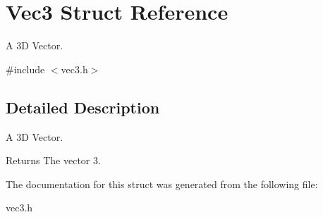 \hypertarget{struct_vec3}{}\section{Vec3 Struct Reference}
\label{struct_vec3}


A 3\+D Vector.  




{\ttfamily \#include $<$vec3.\+h$>$}



\subsection{Detailed Description}
A 3\+D Vector. 

\begin{DoxyReturn}{Returns}
The vector 3. 
\end{DoxyReturn}


The documentation for this struct was generated from the following file\+:\begin{DoxyCompactItemize}
\item 
vec3.\+h\end{DoxyCompactItemize}
